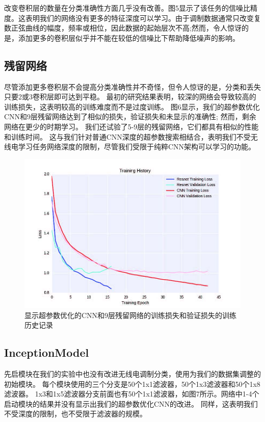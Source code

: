 改变卷积层的数量在分类准确性方面几乎没有改善。图5显示了该任务的信噪比精度。这表明我们的网络没有更多的特征深度可以学习。由于调制数据通常只改变复数正弦曲线的幅度，频率或相位，因此数据的起始层次不高;然而，令人惊讶的是，添加更多的卷积层似乎并不能在较低的信噪比下帮助降低噪声的影响。\par

\subsection{残留网络}
尽管添加更多卷积层不会提高分类准确性并不奇怪，但令人惊讶的是，分类和丢失只要2或3卷积层即可达到平稳。 最初的研究结果表明，较深的网络会导致较高的训练损失，这表明较高的训练难度而不是过度训练。 图6显示，我们的超参数优化CNN和9层残留网络达到了相似的损失，验证损失和未显示的准确性; 然而，剩余网络在更少的时期学习。 我们还试验了5-9层的残留网络，它们都具有相似的性能和训练时间。 这与我们针对普通CNN深度的超参数搜索相结合，表明我们不受无线电学习任务网络深度的限制，尽管我们受限于纯粹CNN架构可以学习的功能。\par

\begin{figure}[!h]
	\centering
	\includegraphics[scale=1]{figures/chapter_5/fig4}
	\caption{显示超参数优化的CNN和9层残留网络的训练损失和验证损失的训练历史记录}
\end{figure}
\par

\subsection{InceptionModel}
先启模块在我们的实验中也没有改进无线电调制分类，使用为我们的数据集调整的初始模块。 每个模块使用的三个分支是50个1x1滤波器，50个1x3滤波器和50个1x8滤波器。 1x3和1x5滤波器分支前面也有50个1x1滤波器，如图7所示。网络中1-4个启动模块的结果并没有显示出我们的超参数优化CNN的改进。 同样，这表明我们不受深度的限制，也不受限于滤波器的规模。\par

